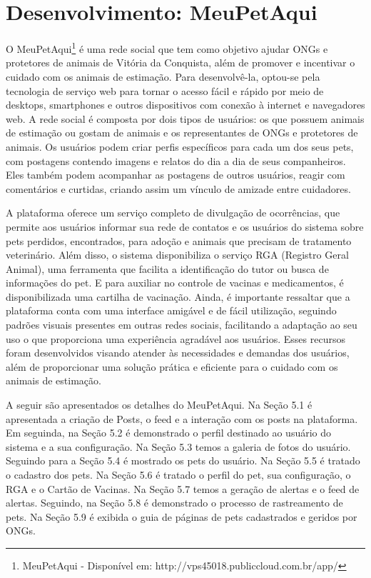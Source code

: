 \chapter{Desenvolvimento: MeuPetAqui}

O MeuPetAqui\footnote{MeuPetAqui - Disponível em: http://vps45018.publiccloud.com.br/app/}  é uma rede social que tem como objetivo ajudar ONGs e protetores de animais de Vitória da Conquista, além de promover e incentivar o cuidado com os animais de estimação. Para desenvolvê-la, optou-se pela tecnologia de serviço web para tornar o acesso fácil e rápido por meio de desktops, smartphones e outros dispositivos com conexão à internet e navegadores web. A rede social é composta por dois tipos de usuários: os que possuem animais de estimação ou gostam de animais e os representantes de ONGs e protetores de animais. Os usuários podem criar perfis específicos para cada um dos seus pets, com postagens contendo imagens e relatos do dia a dia de seus companheiros. Eles também podem acompanhar as postagens de outros usuários, reagir com comentários e curtidas, criando assim um vínculo de amizade entre cuidadores.

A plataforma oferece um serviço completo de divulgação de ocorrências, que permite aos usuários informar sua rede de contatos e os usuários do sistema sobre pets perdidos, encontrados, para adoção e animais que precisam de tratamento veterinário. Além disso, o sistema disponibiliza o serviço RGA (Registro Geral Animal), uma ferramenta que facilita a identificação do tutor ou busca de informações do pet. E para auxiliar no controle de vacinas e medicamentos, é disponibilizada uma cartilha de vacinação. Ainda, é importante ressaltar que a plataforma conta com uma interface amigável e de fácil utilização, seguindo padrões visuais presentes em outras redes sociais, facilitando a adaptação ao seu uso o que proporciona uma experiência agradável aos usuários. Esses recursos foram desenvolvidos visando atender às necessidades e demandas dos usuários, além de proporcionar uma solução prática e eficiente para o cuidado com os animais de estimação.

A seguir são apresentados os detalhes do MeuPetAqui. Na Seção 5.1 é apresentada a criação de Posts, o feed e a interação com os posts na plataforma. Em seguinda, na Seção 5.2 é demonstrado o perfil destinado ao usuário do sistema e a sua configuração. Na Seção 5.3 temos a galeria de fotos do usuário. Seguindo para a Seção 5.4 é mostrado os pets do usuário. Na Seção 5.5 é tratado o cadastro dos pets. Na Seção 5.6 é tratado o perfil do pet, sua configuração, o RGA e o Cartão de Vacinas. Na Seção 5.7 temos a geração de alertas e o feed de alertas. Seguindo, na Seção 5.8 é demonstrado o processo de rastreamento de pets. Na Seção 5.9 é exibida o guia de páginas de pets cadastrados e geridos por ONGs.

